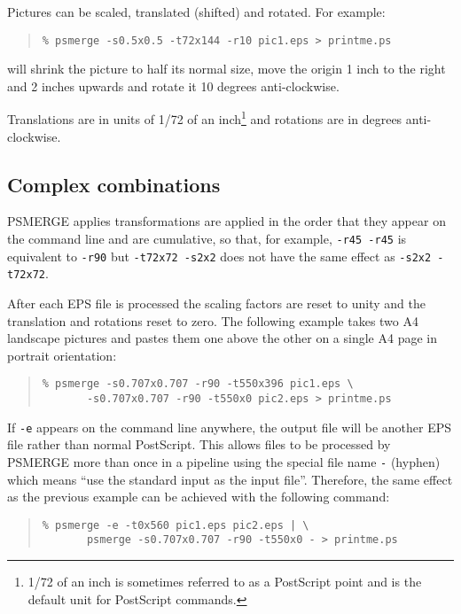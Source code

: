 \documentclass[twoside,11pt]{article}
\newcommand{\xlabel}[1]{}
\begin{document}
Pictures can be scaled, translated (shifted) and rotated. For example:

\begin{quote}\begin{verbatim}
% psmerge -s0.5x0.5 -t72x144 -r10 pic1.eps > printme.ps
\end{verbatim}\end{quote}

will shrink the picture to half its normal size, move the origin 1 inch to the
right and 2 inches upwards and rotate it 10 degrees anti-clockwise.

Translations are in units of 1/72 of an inch\footnote{1/72 of an inch
is sometimes referred to as a PostScript point and is the default unit
for PostScript commands.} and rotations are in degrees anti-clockwise.

\subsection{\xlabel{complex_combinations}Complex combinations}

PSMERGE applies transformations are applied in the order that they
appear on the command line and are cumulative, so that, for example,
\texttt{-r45~-r45} is equivalent to \texttt{-r90} but
\texttt{-t72x72~-s2x2} does not have the same effect as
\texttt{-s2x2~-t72x72}.

After each EPS file is processed the scaling factors are reset to unity
and the translation and rotations reset to zero.  The following example
takes two A4 landscape pictures and pastes them one above the other on
a single A4 page in portrait orientation:

\begin{quote}\begin{verbatim}
% psmerge -s0.707x0.707 -r90 -t550x396 pic1.eps \
       -s0.707x0.707 -r90 -t550x0 pic2.eps > printme.ps
\end{verbatim}\end{quote}

If \texttt{-e} appears on the command line anywhere, the output file
will be another EPS file rather than normal PostScript.  This allows
files to be processed by PSMERGE more than once in a pipeline using the
special file name \texttt{-} (hyphen) which means ``use the standard
input as the input file''.  Therefore, the same effect as the previous
example can be achieved with the following command:

\begin{quote}\begin{verbatim}
% psmerge -e -t0x560 pic1.eps pic2.eps | \
       psmerge -s0.707x0.707 -r90 -t550x0 - > printme.ps
\end{verbatim}\end{quote}
\end{document}
